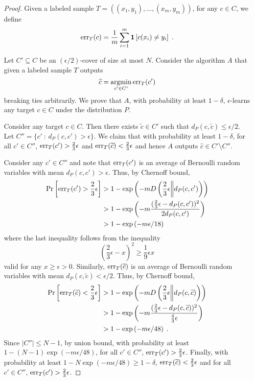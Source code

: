 \begin{proof}
Given a labeled sample $T = ( (x_1, y_1), \dots, (x_m, y_m) )$, for any $c \in C$,
we define
$$
\operatorname{err}_T(c) = \frac{1}{m} \sum_{i=1}^m \mathbf{1}\left[{c(x_i) \neq y_i}\right] \; .
$$

Let $C' \subseteq C$ be an $(\epsilon/2)$-cover of size at most $N$.
Consider the algorithm $A$ that given a labeled sample $T$ outputs
$$
\widehat c = \operatorname*{argmin}_{c' \in C'} \operatorname{err}_T(c')
$$
breaking ties arbitrarily. We prove that $A$, with probability at least
$1-\delta$, $\epsilon$-learns any target $c \in C$ under the distribution $P$.

Consider any target $c \in C$. Then there exists $\widetilde c \in C'$ such that
$d_P(c,\widetilde c) \le \epsilon/2$. Let $C'' = \{ c' ~:~ d_P(c,c') > \epsilon \}$.
We claim that with probability at least $1 - \delta$, for all $c' \in C''$,
$\operatorname{err}_T(c') > \frac{2}{3} \epsilon$ and $\operatorname{err}_T(\widetilde{c}) <
\frac{2}{3}\epsilon$ and hence $A$ outputs $\widehat c \in C' \setminus C''$.

Consider any $c' \in C''$ and note that $\operatorname{err}_T(c')$ is an average of Bernoulli
random variables with mean $d_P(c,c') > \epsilon$. Thus, by Chernoff bound,
\begin{align*}
\Pr \left[ \operatorname{err}_T(c') > \frac{2}{3} \epsilon \right]
& > 1 - \exp \left( - m D\left(\frac{2}{3} \epsilon \middle\| d_P(c,c') \right) \right) \\
& > 1 - \exp \left( - m \frac{(\frac{2}{3} \epsilon - d_P(c,c'))^2}{2 d_P(c,c')} \right) \\
& > 1 - \exp \left( - m \epsilon/18 \right)
\end{align*}
where the last inequality follows from the inequality
$$
\left( \frac{2}{3} \epsilon - x \right)^2 \ge \frac{1}{9} \epsilon x
$$
valid for any $x \ge \epsilon > 0$.
Similarly, $\operatorname{err}_T(\widetilde{c})$ is an average of Bernoulli random variables with mean $d_P(c, \widetilde{c}) < \epsilon/2$.
Thus, by Chernoff bound,
\begin{align*}
\Pr \left[ \operatorname{err}_T(\widetilde{c}) < \frac{2}{3} \epsilon \right]
& > 1 - \exp \left( - m D\left(\frac{2}{3} \epsilon \middle\| d_P(c, \widetilde{c}) \right) \right) \\
& > 1 - \exp \left( - m \frac{(\frac{2}{3} \epsilon - d_P(c, \widetilde{c}))^2}{\frac{4}{3} \epsilon} \right) \\
& > 1 - \exp \left( - m \epsilon / 48 \right) \; .
\end{align*}
Since $|C''| \le N - 1$, by union bound, with probability at least $1 - (N - 1)
\exp(-m \epsilon/48)$, for all $c' \in C''$, $\operatorname{err}_T(c') > \frac{2}{3}
\epsilon$. Finally, with probability at least $1 - N \exp(-m \epsilon/48) \ge 1 -
\delta$, $\operatorname{err}_T(\widetilde{c}) < \frac{2}{3}\epsilon$ and for all $c' \in C''$,
$\operatorname{err}_T(c') > \frac{2}{3} \epsilon$.
\end{proof}
